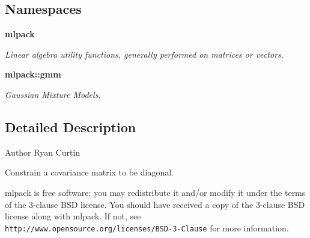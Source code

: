 \subsection*{Namespaces}
\begin{DoxyCompactItemize}
\item 
 \textbf{ mlpack}
\begin{DoxyCompactList}\small\item\em Linear algebra utility functions, generally performed on matrices or vectors. \end{DoxyCompactList}\item 
 \textbf{ mlpack\+::gmm}
\begin{DoxyCompactList}\small\item\em Gaussian Mixture Models. \end{DoxyCompactList}\end{DoxyCompactItemize}


\subsection{Detailed Description}
\begin{DoxyAuthor}{Author}
Ryan Curtin
\end{DoxyAuthor}
Constrain a covariance matrix to be diagonal.

mlpack is free software; you may redistribute it and/or modify it under the terms of the 3-\/clause B\+SD license. You should have received a copy of the 3-\/clause B\+SD license along with mlpack. If not, see {\tt http\+://www.\+opensource.\+org/licenses/\+B\+S\+D-\/3-\/\+Clause} for more information. 